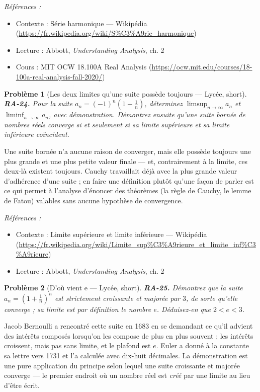 \documentclass[11pt]{article}
\newtheorem{problem}{Problème}
\newenvironment{refs}{\par\small\noindent\emph{Références :}\begin{itemize}\setlength\itemsep{0pt}}{\end{itemize}\normalsize}
\begin{document}
\begin{refs}
\item Contexte : Série harmonique --- Wikipédia (\url{https://fr.wikipedia.org/wiki/S%C3%A9rie_harmonique})
\item Lecture : Abbott, \textit{Understanding Analysis}, ch. 2
\item Cours : MIT OCW 18.100A Real Analysis (\url{https://ocw.mit.edu/courses/18-100a-real-analysis-fall-2020/})
\end{refs}

\bigskip

\begin{problem}[{Les deux limites qu'une suite possède toujours --- Lycée, short}]
\textbf{RA-24.} Pour la suite $ a_n = (-1)^n \left( 1 + \frac{1}{n}
\right) $, déterminez $ \limsup_{n \to \infty} a_n $ et $ \liminf_{n \to \infty} a_n $, avec
démonstration. Démontrez ensuite qu'une suite bornée de nombres réels converge si et seulement si sa
limite supérieure et sa limite inférieure coïncident.
\end{problem}

\noindent Une suite bornée n'a aucune raison de converger, mais elle possède toujours une
plus grande et une plus petite \og{} valeur finale \fg{} --- et, contrairement à la limite, ces deux-là
existent toujours. Cauchy travaillait déjà avec la plus grande valeur d'adhérence d'une suite ; en
faire une définition plutôt qu'une façon de parler est ce qui permet à l'analyse d'énoncer des
théorèmes (la règle de Cauchy, le lemme de Fatou) valables sans aucune hypothèse de convergence.

\begin{refs}
\item Contexte : Limite supérieure et limite inférieure --- Wikipédia (\url{https://fr.wikipedia.org/wiki/Limite_sup%C3%A9rieure_et_limite_inf%C3%A9rieure})
\item Lecture : Abbott, \textit{Understanding Analysis}, ch. 2
\end{refs}

\bigskip

\begin{problem}[{D'où vient e --- Lycée, short}]
\textbf{RA-25.} Démontrez que la suite
$ a_n = \left( 1 + \frac{1}{n} \right)^{n} $ est strictement croissante et majorée par
$ 3 $, de sorte qu'elle converge ; sa limite est par définition le nombre $ e $. Déduisez-en
que $ 2 < e < 3 $.
\end{problem}

\noindent Jacob Bernoulli a rencontré cette suite en 1683 en se demandant ce qu'il advient
des intérêts composés lorsqu'on les compose de plus en plus souvent ; les intérêts croissent, mais
pas sans limite, et le plafond est $ e $. Euler a donné à la constante sa lettre vers 1731 et l'a
calculée avec dix-huit décimales. La démonstration est une pure application du principe selon lequel
une suite croissante et majorée converge --- le premier endroit où un nombre réel est \textit{créé} par
une limite au lieu d'être écrit.
\end{document}
